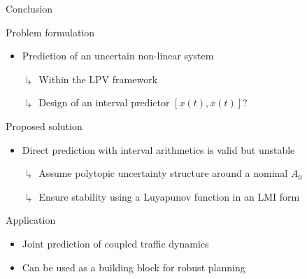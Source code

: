\documentclass[slideopt,A4,showboxes,svgnames]{beamer}
\begin{document}
\begin{frame}{Conclusion}
    
    \begin{block}{Problem formulation}
    \begin{itemize}
        \item Prediction of an {\red uncertain non-linear} system
        \item[\red $\drsh$] Within the \alert{LPV} framework
        \item[\red $\drsh$] Design of an \alert{interval} predictor $[\underline{x}(t), \overline{x}(t)]$?
    \end{itemize}
    \end{block}
    
    \begin{block}{Proposed solution}
    \begin{itemize}
        \item Direct prediction with interval arithmetics is \alert{valid} but {\red unstable}
        \item[\red $\drsh$] Assume \alert{polytopic uncertainty} structure around a nominal $A_0$
        \item[\red $\drsh$] \alert{Ensure stability} using a Luyapunov function in an LMI form
    \end{itemize}
    \end{block}
    
    \begin{block}{Application}
    \begin{itemize}
        \item Joint prediction of coupled traffic dynamics
        \item Can be used as a building block for robust planning
    \end{itemize}
    \end{block}
\end{frame}
\end{document}
